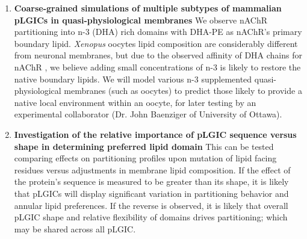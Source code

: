\documentclass{article}
\begin{document}
\begin{enumerate}
  \item \textbf{Coarse-grained simulations of multiple subtypes of mammalian pLGICs in quasi-physiological membranes}  We observe nAChR partitioning into n-3 (DHA) rich domains with DHA-PE as nAChR’s primary boundary lipid. \textit{Xenopus} oocytes lipid composition are considerably different from neuronal membranes, but due to the observed affinity of DHA chains for nAChR , we believe adding small concentrations of n-3 is likely to restore the native boundary lipids. We will model various n-3 supplemented quasi-physiological membranes (such as oocytes) to predict those likely to provide a native local environment within an oocyte, for later testing by an experimental collaborator (Dr. John Baenziger of University of Ottawa). %

  \item \textbf{Investigation of the relative importance of pLGIC sequence versus shape in determining preferred lipid domain} This can be tested comparing effects on partitioning profiles upon mutation of lipid facing residues versus adjustments in membrane lipid composition. If the effect of the protein's sequence is measured to be greater than its shape, it is likely that pLGICs will display significant variation in partitioning behavior and annular lipid preferences. If the reverse is observed, it is likely that overall pLGIC shape and relative flexibility of domains drives partitioning; which may be shared across all pLGIC. %


\end{enumerate}
\end{document}

